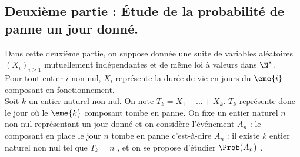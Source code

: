 \documentclass[11pt]{article}%
\begin{document}
\subsection*{Deuxième partie : Étude de la probabilité de 
panne un jour donné.}
\noindent
Dans cette deuxième partie, on suppose donnée une suite de variables
aléatoires $(X_i)_{i \geq 1}$ mutuellement indépendantes et de même
loi à valeurs dans $\N^*$.\\
Pour tout entier $i$ non nul, $X_i$ représente la durée de vie en
jours du $\eme{i}$ composant en fonctionnement.\\
Soit $k$ un entier naturel non nul. On note $T_k= X_1+...+X_k$. $T_k$
représente donc le jour où le $\eme{k}$ composant tombe en panne. On
fixe un entier naturel $n$ non nul représentant un jour donné et on
considère l'événement $A_n$ : \og le composant en place le jour $n$
tombe en panne \fg{} c'est-à-dire $A_n$ : \og il existe $k$ entier
naturel non nul tel que $T_k=n$ \fg{}, et on se propose d'étudier
$\Prob(A_n)$ .
\end{document}
